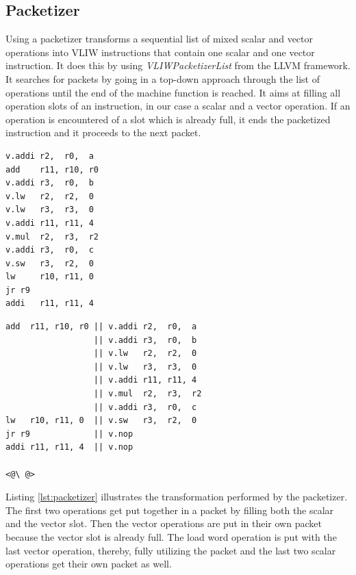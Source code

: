 \subsection{Packetizer}
Using a packetizer transforms a sequential list of mixed scalar and vector operations into VLIW instructions that contain one scalar and one vector instruction. It does this by using \emph{VLIWPacketizerList} from the LLVM framework. 
It searches for packets by going in a top-down approach through the list of operations until the end of the machine function is reached. It aims at filling all operation slots of an instruction, in our case a scalar and a vector operation. If an operation is encountered of a slot which is already full, it ends the packetized instruction and it proceeds to the next packet. 

\label{lst:packetizer}
\begin{center}
\hspace{2px}\begin{minipage}{.45\textwidth}
\begin{lstlisting}[frame=tlrb]
v.addi r2,  r0,  a
add    r11, r10, r0
v.addi r3,  r0,  b
v.lw   r2,  r2,  0
v.lw   r3,  r3,  0
v.addi r11, r11, 4
v.mul  r2,  r3,  r2
v.addi r3,  r0,  c
v.sw   r3,  r2,  0
lw     r10, r11, 0
jr r9
addi   r11, r11, 4
\end{lstlisting}
\end{minipage}\hfill
\begin{minipage}{.5\textwidth}
\begin{lstlisting}[frame=tlrb]
add  r11, r10, r0 || v.addi r2,  r0,  a
                  || v.addi r3,  r0,  b
                  || v.lw   r2,  r2,  0
                  || v.lw   r3,  r3,  0
                  || v.addi r11, r11, 4
                  || v.mul  r2,  r3,  r2
                  || v.addi r3,  r0,  c
lw   r10, r11, 0  || v.sw   r3,  r2,  0
jr r9             || v.nop
addi r11, r11, 4  || v.nop

<@\ @>
\end{lstlisting}
\end{minipage}
\end{center}

Listing \ref{lst:packetizer} illustrates the transformation performed by the packetizer. The first two operations get put together in a packet by filling both the scalar and the vector slot. Then the vector operations are put in their own packet because the vector slot is already full. The load word operation is put with the last vector operation, thereby, fully utilizing the packet and the last two scalar operations get their own packet as well. %


